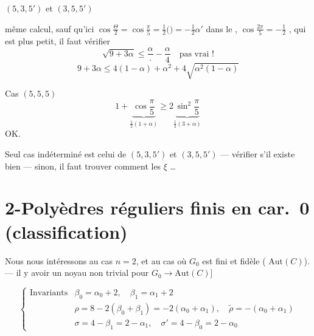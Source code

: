 \documentclass[11pt,a4paper]{article}
\begin{document}
\quad $\boxed{(5,3,5')}$ et $\boxed{(3,5,5')}$

même calcul, sauf qu'ici
$\cos\frac{\Theta}{2} = \cos\frac{\pi}{5} = \frac{1}{2}($$)
= -\frac{1}{2}\alpha'$ dans le , 
$\cos\frac{2\pi}{5} = -\frac{1}{2}$ \struck{\ill{}}, qui est plus petit, il
faut vérifier
\[
\sqrt{9 + 3\alpha} \leq \frac{\alpha}{\cdot} - \frac{\alpha}{4}\quad \text{pas vrai~!}
\]
\[
9 + 3\alpha \leq 4(1 - \alpha) + \alpha^2 + 4\sqrt{\alpha^2(1 - \alpha)}
\]

Cas $\boxed{(5,5,5)}$
\[
1 + \underbrace{\cos\frac{\pi}{5}}_{\frac{1}{2}(1 + \alpha)}
\geq 2\underbrace{\sin^2\frac{\pi}{5}}_{\frac{1}{2}(3 + \alpha)}
\]
  OK.

Seul cas indéterminé est celui de
\emph{$(5,3,5')$} et \emph{$(3,5,5')$} --- vérifier s'il existe bien ---
sinon, il faut trouver comment
 les $\xi$ \ldots
{}


\section{2-Polyèdres réguliers finis en car.\ 0 (classification)}

Nous nous intéressons au cas $n = 2$, et au cas où $G_0$ est fini et
  fidèle  (
$\mathrm{Aut}(C)$). --- il  y avoir un noyau non
trivial pour $G_0 \to \mathrm{Aut}(C)$]

\[
\left\lbrace
\begin{array}{ll}
\text{Invariants} & \beta_0 = \alpha_0 + 2,\quad \beta_1 = \alpha_1 + 2 \\
 & \rho = 8 - 2(\beta_0 + \beta_1) = -2(\alpha_0 + \alpha_1),\quad
 \tilde{\rho} = -(\alpha_0 + \alpha_1) \\
 & \sigma = 4 - \beta_1 = 2 - \alpha_1,\quad \sigma' = 4 - \beta_0 = 2 - \alpha_0
\end{array}\right.
\]
\end{document}
